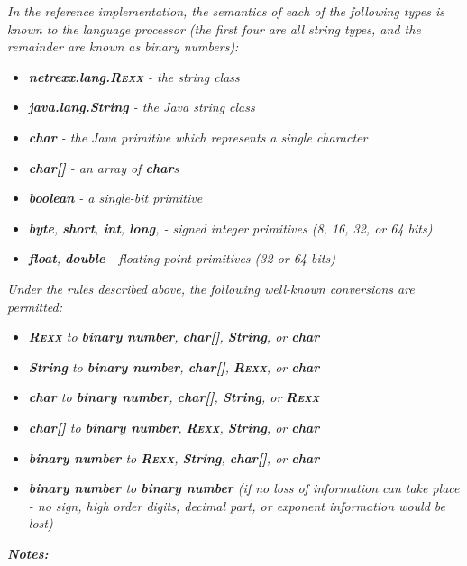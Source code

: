\emph{In the reference implementation, the semantics of each of the
following types is known to the language processor (the first four are
all \emph{string} types, and the remainder are known as \emph{binary
number}s):}
\begin{itemize}
\item \emph{\textbf{netrexx.lang.R\textsc{exx}} - the \nr{} string class}
\item \emph{\textbf{java.lang.String} - the Java string class}
\item \emph{\textbf{char} - the Java primitive which represents a single
character}
\item \emph{\textbf{char[]} - an array of
\textbf{char}s}
\item \emph{\textbf{boolean} - a single-bit primitive}
\item \emph{\textbf{byte}, \textbf{short}, \textbf{int}, \textbf{long},
- signed integer primitives (8, 16, 32, or 64 bits)}
\item \emph{\textbf{float}, \textbf{double} - floating-point
primitives (32 or 64 bits)}
\end{itemize}
\emph{Under the rules described above, the following well-known
conversions are permitted:}
\begin{itemize}
\item \emph{\textbf{R\textsc{exx}} \emph{to} \textbf{binary number}, \textbf{char[]}, \textbf{String},
or \textbf{char}}
\item \emph{\textbf{String} \emph{to} \textbf{binary number}, \textbf{char[]}, \textbf{R\textsc{exx}},
or \textbf{char}}
\item \emph{\textbf{char} \emph{to} \textbf{binary number}, \textbf{char[]}, \textbf{String},
or \textbf{R\textsc{exx}}}
\item \emph{\textbf{char[]} \emph{to} \textbf{binary number}, \textbf{R\textsc{exx}}, \textbf{String},
or \textbf{char}}
\item \emph{\textbf{binary number} \emph{to} \textbf{R\textsc{exx}}, \textbf{String}, \textbf{char[]},
or \textbf{char}}
\item \emph{\textbf{binary number} \emph{to} \textbf{binary number} (if no loss of
information can take place - no sign, high order digits, decimal
part, or exponent information would be lost)}
\end{itemize}
 \emph{\textbf{Notes:}}

